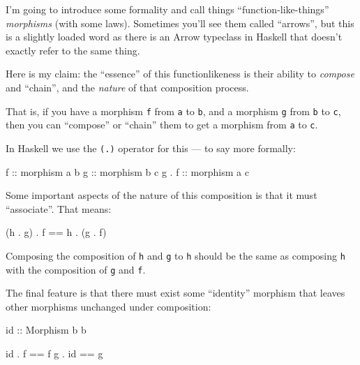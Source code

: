 \documentclass[]{article}
\newenvironment{Shaded}{}{}
\newcommand{\DataTypeTok}[1]{\textcolor[rgb]{0.56,0.13,0.00}{{#1}}}
\newcommand{\OtherTok}[1]{\textcolor[rgb]{0.00,0.44,0.13}{{#1}}}
\newcommand{\FunctionTok}[1]{\textcolor[rgb]{0.02,0.16,0.49}{{#1}}}
\newcommand{\NormalTok}[1]{{#1}}
\begin{document}
I'm going to introduce some formality and call things
``function-like-things'' \emph{morphisms} (with some laws). Sometimes
you'll see them called ``arrows'', but this is a slightly loaded word as
there is an Arrow typeclass in Haskell that doesn't exactly refer to the
same thing.

Here is my claim: the ``essence'' of this functionlikeness is their
ability to \emph{compose} and ``chain'', and the \emph{nature} of that
composition process.

That is, if you have a morphism \texttt{f} from \texttt{a} to
\texttt{b}, and a morphism \texttt{g} from \texttt{b} to \texttt{c},
then you can ``compose'' or ``chain'' them to get a morphism from
\texttt{a} to \texttt{c}.

In Haskell we use the \texttt{(.)} operator for this --- to say more
formally:

\begin{Shaded}
\begin{Highlighting}[]
\OtherTok{f     ::} \NormalTok{morphism a b}
\OtherTok{g     ::} \NormalTok{morphism b c}
\NormalTok{g }\FunctionTok{.}\OtherTok{ f ::} \NormalTok{morphism a c}
\end{Highlighting}
\end{Shaded}

Some important aspects of the nature of this composition is that it must
``associate''. That means:

\begin{Shaded}
\begin{Highlighting}[]
\NormalTok{(h }\FunctionTok{.} \NormalTok{g) }\FunctionTok{.} \NormalTok{f }\FunctionTok{==} \NormalTok{h }\FunctionTok{.} \NormalTok{(g }\FunctionTok{.} \NormalTok{f)}
\end{Highlighting}
\end{Shaded}

Composing the composition of \texttt{h} and \texttt{g} to \texttt{h}
should be the same as composing \texttt{h} with the composition of
\texttt{g} and \texttt{f}.

The final feature is that there must exist some ``identity'' morphism
that leaves other morphisms unchanged under composition:

\begin{Shaded}
\begin{Highlighting}[]
\NormalTok{id}\OtherTok{ ::} \DataTypeTok{Morphism} \NormalTok{b b}

\NormalTok{id }\FunctionTok{.} \NormalTok{f  }\FunctionTok{==} \NormalTok{f}
\NormalTok{g  }\FunctionTok{.} \NormalTok{id }\FunctionTok{==} \NormalTok{g}
\end{Highlighting}
\end{Shaded}
\end{document}
